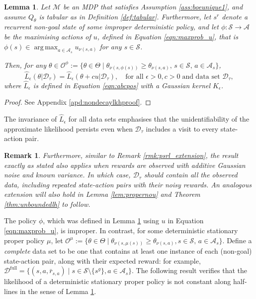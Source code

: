 \documentclass{amsart}
\newtheorem{lemma}{Lemma}
\newtheorem{remark}{Remark}
\DeclareMathOperator*{\argmax}{arg\,max}
\begin{document}
\begin{lemma}
Let $\mathcal{M}$ be an MDP that satisfies Assumption \ref{ass:boeunique1}, and assume $Q_\theta$  is tabular as in Definition \ref{def:tabular}.
Furthermore, let $s^r$ denote a recurrent non-goal state of some improper deterministic policy, and let $\phi:\mathcal{S} \rightarrow \mathcal{A}$ be the maximising actions of $u$, defined in Equation \ref{eqn:maxprob_u}, that is $\phi(s) \in \argmax_{a \in \mathcal{A}_{s}} u_{\nu(s,a)}$ for any $s \in \mathcal{S}$. 

Then, for any $\theta \in \mathcal{O}^\phi  := \{\theta \in \Theta\mid \theta_{\nu(s,\phi(s))} \geq \theta_{\nu(s,a)},\,s \in \mathcal{S}, \,  a\in\mathcal{A}_s\}$, $$\hat{L}_\epsilon(\theta|\mathcal{D}_\tau) = \hat{L}_\epsilon(\theta+cu|\mathcal{D}_\tau),\quad \textrm{for all } \epsilon>0, c > 0 \; \textrm{and data set } \mathcal{D}_\tau,$$
where $\hat{L}_\epsilon$ is defined in Equation \ref{eqn:abcpos} with a Gaussian kernel $K_\epsilon$.
\label{lem:loopthm}
\end{lemma}


\begin{proof}
    See Appendix \ref{apd:nondecaylkhproof}.
\end{proof}
The invariance of $\hat{L}_\epsilon$ for all data sets emphasises that the unidentifiability of the approximate likelihood persists even when $\mathcal{D}_\tau$ includes a visit to every state-action pair.

\begin{remark}
Furthermore, similar to Remark \ref{rmk:psrl_extension}, the result exactly as stated also applies when rewards are observed with additive Gaussian noise and known variance. In which case, $\mathcal{D}_\tau$ should contain all the observed data, including repeated state-action pairs with their noisy rewards. An analogous extension will also hold in Lemma \ref{lem:propernou} and Theorem \ref{thm:unboundedlh} to follow.
\end{remark}


The policy $\phi$, which was defined in Lemma \ref{lem:loopthm} using $u$ in Equation \ref{eqn:maxprob_u}, is improper. In contrast, for some deterministic stationary proper policy $\mu$, let $\mathcal{O}^\mu := \{\theta \in \Theta\mid \theta_{\nu(s,\mu(s))} \geq \theta_{\nu(s,a)}, s \in \mathcal{S},\, a \in \mathcal{A}_s\}$. Define a \textit{complete} data set to be one that contains at least one instance of each (non-goal) state-action pair, along with their expected reward: for example, $\mathcal{D}^{\mathrm{full}}=\{(s,a,\bar{r}_{s,a}) \mid s \in \mathcal{S} \setminus \{s^g\}, a \in \mathcal{A}_s\}$. The following result verifies that the likelihood of a deterministic stationary proper policy is not constant along half-lines in the sense of Lemma \ref{lem:loopthm}.
\end{document}
